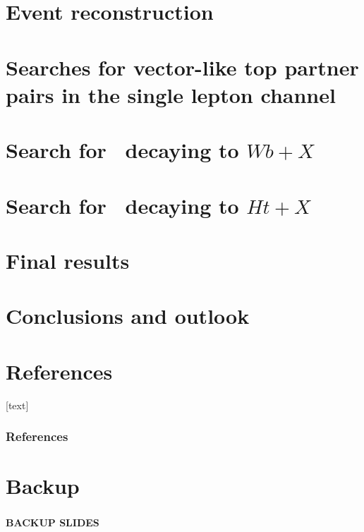 \documentclass[xcolor=dvipsnames,10pt]{beamer}
\begin{document}
\section{Event reconstruction}

\section{Searches for vector-like top partner pairs in the single lepton channel}

\section{Search for \TTbar\ decaying to $Wb+X$}

\section{Search for \TTbar\ decaying to $Ht+X$}

\section{Final results}

\section{Conclusions and outlook}


\appendix


\section*{References}
[text]

\begin{frame}[allowframebreaks]
\frametitle{References}\footnotesize

%

\end{frame}


\section*{Backup}

\begin{frame}
 \frametitle{}

\begin{center}{\bfseries
BACKUP SLIDES}
\end{center}
\end{frame}
\end{document}
